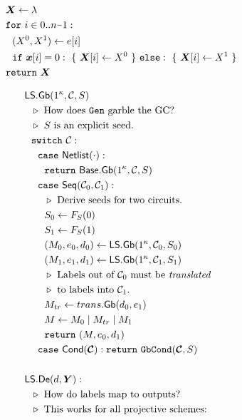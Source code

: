 \begin{figure}
\begin{adjustwidth}{-0.1\textwidth}{-0.1\textwidth}
\begin{minipage}[t]{0.56\linewidth}
\begin{align*}
      &~~\gcirinp \gets \emptystring\\
      &~~\cfor~i \in 0..n\minus 1:\\
      &~~~~(X^0, X^1) \gets e[i]\\
      &~~~~\cif~\cirinp[i] = 0:~\{~\gcirinp[i] \gets X^0~\}~\celse:~\{~\gcirinp[i] \gets X^1~\}\\
      &~~\creturn~\gcirinp
    \end{align*}
  \end{minipage}
  \begin{minipage}[t]{0.40\linewidth}
    \begin{align*}
      &\ourscheme.\gGb(1^\kappa, \cir, S)\\
      &~~\codecomment{How does \G garble the GC?}\\
      &~~\codecomment{$S$ is an explicit seed.}\\
      &~~\switch~\cir:\\
      &~~~~\ccase~\netlist(\cdot):\\
      &~~~~~~\creturn~\underscheme.\gGb(1^\kappa,\cir,S)\\
      &~~~~\ccase~\sequential(\cir_0, \cir_1):\\
      &~~~~~~\codecomment{Derive seeds for two circuits.}\\
      &~~~~~~S_0 \gets F_S(0)\\
      &~~~~~~S_1 \gets F_S(1)\\
      &~~~~~~(\mat_0, e_0, d_0) \gets \ourscheme.\gGb(1^\kappa,\cir_0, S_0)\\
      &~~~~~~(\mat_1, e_1, d_1) \gets \ourscheme.\gGb(1^\kappa,\cir_1, S_1)\\
      &~~~~~~\codecomment{Labels out of $\cir_0$ must be \emph{translated}}\\
      &~~~~~~\codecomment{to labels into $\cir_1$.}\\
      &~~~~~~\mat_{tr} \gets \gbtranslate(d_0,e_1)\\
      &~~~~~~\mat \gets \mat_0\mid \mat_{tr}\mid \mat_1\\
      &~~~~~~\creturn~(\mat, e_0, d_1)\\
      &~~~~\ccase~\conditional(\vec \cir): \creturn~\gbcond(\vec \cir, S)\\
      \\
      &\ourscheme.\gDe(d, \gcirout):\\
      &~~\codecomment{How do labels map to outputs?}\\
      &~~\codecomment{This works for all projective schemes:}\\

\end{align*}
\end{minipage}
\end{adjustwidth}
\end{figure}
